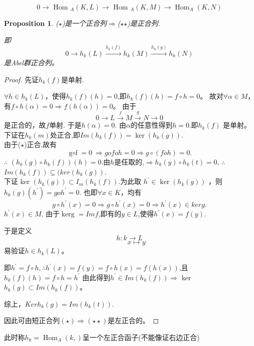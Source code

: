 \documentclass[UTF8]{article}
\newtheorem{prop}{Proposition}[section]
\begin{document}
\begin{equation}
0 \rightarrow \text { Hom }_{A}(K, L) \rightarrow \text { Hom }_{A}(K, M) \rightarrow \operatorname{Hom}_{A}(K, N)\tag{$\star$$\star$}
\end{equation}
\begin{prop}
($\star$)是一个正合列$\Rightarrow$($\star$$\star$)是正合列.

即
$$0 \rightarrow h_{k}(L)\stackrel{h_k(f)}{\longrightarrow}h_{k}(M)\stackrel{h_k(g)}{\longrightarrow} h_{k}(N)$$
是Abel群正合列。
\end{prop}
\begin{proof}
	先证$h_{k}(f)$是单射.
	
	
	$\forall h \in h_{k}(L)$，使得$h_{k}(f)(h)=0$,即$h_{k}(f)(h)=f\circ h=0$。
	故对$\forall \alpha \in M$，有$f\circ h(\alpha)=0 \Rightarrow f(h(\alpha))=0$。	
	由于
	$$0 \rightarrow L 	\stackrel{f}{\longrightarrow}  M 	\stackrel{g}{\longrightarrow}  N \rightarrow 0$$
	是正合的，故$f$单射.
	于是$h(\alpha)=0$. 由$\alpha$的任意性得到$h=0$.即$h_{k}(f)$ 是单射。\\
	
	
	下证在$h_{k}(m)$处正合,即$Im\left(h_{k}(f)\right)=\operatorname{ker}\left(h_{k}(g)\right)$.\\
	由于($\star$)正合,故有$$ \operatorname{g\circ f}=0\ \Rightarrow g o f o h=0\Rightarrow g\circ (foh)=0.$$
	$\therefore $ $(h_{k}(g)\circ h_{k}(f))(h)=0$.由$h$是任取的,$\Rightarrow h_{k}(y) \circ h_{k}(t)=0$,
	$\therefore$  $Im(h_{k}(f)) \subseteq (ker(h_{k}(g))$.\\
	
	下证 ker $\left(h_{k}(g)\right) \subset I_{m}\left(h_{k}(f)\right).$为此取 $h^{\prime} \in \operatorname{ker}\left(h_{k}(g)\right)$%
	，则$h_{k}(g)\left(h^{\prime}\right)=go h^{\prime}=0.$
	也即$\forall x \in K$，均有
	$$ g\circ h^{\prime}(x)=0\Rightarrow g\circ h^{\prime}(x)=0\Rightarrow h^{\prime}(x) \in ker g.$$
	$h^{\prime}(x) \in M$, 由于$\operatorname{ker g}=Imf$,即有的$y\in L$,使得$h^{\prime}(x)=f(y)$.
	
	于是定义
	$$h:k \rightarrow L$$
	$$\qquad x\mapsto y$$
	易验证$h \in h_{k}(L)$。
	
	即$h^{\prime}=f\circ h ,\therefore h^{\prime}(x)=f(y)=f\circ h(x)=f(h(x))$,且$h_{k}(f)(h)=f\circ  h=h^{\prime}$
	由此得到$ h^{\prime} \in Im(h_{k}(f))\Rightarrow$ ker $h_{k}(g) \subset Im(h_{k}(f))$。
	
	综上，$Kerh_k(g)=Im(h_k(t)).$
	
	因此可由短正合列$(\star)\Rightarrow(\star \star)$是左正合的。
\end{proof}
此时称$h_{k}=\operatorname{Hom}_{A}\left(k,\right)$呈一个左正合函子(不能像证右边正合)
\end{document}
